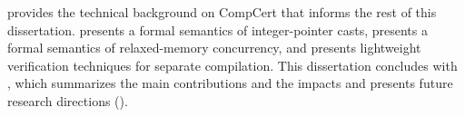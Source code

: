  provides the technical background on CompCert that informs the rest of this
dissertation.   presents a formal semantics of integer-pointer casts,
 presents a formal semantics of relaxed-memory concurrency, and
 presents lightweight verification techniques for separate compilation.  This
dissertation concludes with , which summarizes the main contributions and the
impacts and presents future research directions ().


